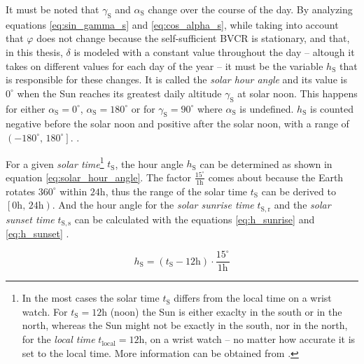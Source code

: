 It must be noted that $\gamma_{\mathrm{S}}$ and $\alpha_{\mathrm{S}}$ change over the course of the day. By analyzing equations \ref{eq:sin_gamma_s} and \ref{eq:cos_alpha_s}, while taking into account that $\varphi$ does not change because the self-sufficient BVCR is stationary, and that, in this thesis, $\delta$ is modeled with a constant value throughout the day -- altough it takes on different values for each day of the year -- it must be the variable $h_{\mathrm{S}}$ that is responsible for these changes. It is called the \emph{solar hour angle} and its value is $0^\circ$ when the Sun reaches its greatest daily altitude $\gamma_{\mathrm{S}}$ at solar noon. This happens for either $\alpha_{\mathrm{S}} = 0^\circ$, $\alpha_{\mathrm{S}} = 180^\circ$ or for $\gamma_{\mathrm{S}} = 90^\circ$ where $\alpha_{\mathrm{S}}$ is undefined. $h_{\mathrm{S}}$ is counted negative before the solar noon and positive after the solar noon, with a range of $\left(-180^\circ \text{, } 180^\circ\right]$. \cite{Appelbaum:1993, Karttunen:2006, Mertens:2015, Wagner:2018}.  

For a given \emph{solar time}\footnote{In the most cases the solar time $t_\mathrm{S}$ differs from the local time on a wrist watch. For $t_\mathrm{S} = 12\mathrm{h}$ (noon) the Sun is either exaclty in the south or in the north, whereas the Sun might not be exactly in the south, nor in the north, for the \emph{local time} $t_\mathrm{local} = 12\mathrm{h}$, on a wrist watch -- no matter how accurate it is set to the local time. More information can be obtained from \cite{Mertens:2015, Wagner:2018}.} $t_\mathrm{S}$, the hour angle $h_\mathrm{S}$ can be determined as shown in equation \ref{eq:solar_hour_angle}. The factor $\frac{15^\circ}{1\mathrm{h}}$ comes about because the Earth rotates $360^\circ$ within $24\mathrm{h}$, thus the range of the solar time $t_\mathrm{S}$ can be derived to $\left[0\mathrm{h} \text{, } 24\mathrm{h}\right)$. And the hour angle for the \emph{solar sunrise time} $t_\mathrm{S,r}$ and the \emph{solar sunset time} $t_\mathrm{S,s}$ can be calculated with the equations \ref{eq:h_sunrise} and \ref{eq:h_sunset} \cite{Appelbaum:1993, Karttunen:2006, Mertens:2015, Wagner:2018}.

\begin{center}
	\begin{equation} \label{eq:solar_hour_angle}
		h_\mathrm{S} = \left(t_\mathrm{S} - 12\mathrm{h} \right) \cdot \frac{15^\circ}{1\mathrm{h}}
	\end{equation}
\end{center}

